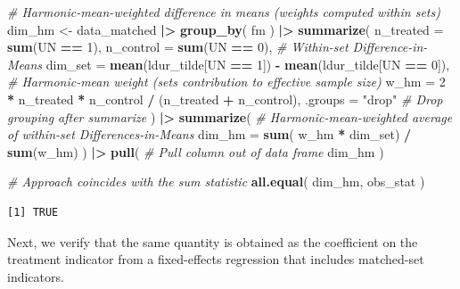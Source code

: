 \documentclass[
  12pt,
  leqno]{article}
\newenvironment{Shaded}{\begin{snugshade}}{\end{snugshade}}
\newcommand{\AttributeTok}[1]{\textcolor[rgb]{0.13,0.29,0.53}{#1}}
\newcommand{\CommentTok}[1]{\textcolor[rgb]{0.56,0.35,0.01}{\textit{#1}}}
\newcommand{\DecValTok}[1]{\textcolor[rgb]{0.00,0.00,0.81}{#1}}
\newcommand{\FunctionTok}[1]{\textcolor[rgb]{0.13,0.29,0.53}{\textbf{#1}}}
\newcommand{\NormalTok}[1]{#1}
\newcommand{\OtherTok}[1]{\textcolor[rgb]{0.56,0.35,0.01}{#1}}
\newcommand{\SpecialCharTok}[1]{\textcolor[rgb]{0.81,0.36,0.00}{\textbf{#1}}}
\newcommand{\StringTok}[1]{\textcolor[rgb]{0.31,0.60,0.02}{#1}}
\begin{document}
\begin{Shaded}
\begin{Highlighting}[]
\CommentTok{\# Harmonic{-}mean{-}weighted difference in means (weights computed within sets)}
\NormalTok{dim\_hm }\OtherTok{\textless{}{-}}\NormalTok{ data\_matched }\SpecialCharTok{|\textgreater{}}
  \FunctionTok{group\_by}\NormalTok{(}
\NormalTok{    fm}
\NormalTok{  ) }\SpecialCharTok{|\textgreater{}}
  \FunctionTok{summarize}\NormalTok{(}
    \AttributeTok{n\_treated =} \FunctionTok{sum}\NormalTok{(UN }\SpecialCharTok{==} \DecValTok{1}\NormalTok{),}
    \AttributeTok{n\_control =} \FunctionTok{sum}\NormalTok{(UN }\SpecialCharTok{==} \DecValTok{0}\NormalTok{),}
    \CommentTok{\# Within{-}set Difference{-}in{-}Means}
    \AttributeTok{dim\_set   =} \FunctionTok{mean}\NormalTok{(ldur\_tilde[UN }\SpecialCharTok{==} \DecValTok{1}\NormalTok{]) }\SpecialCharTok{{-}} \FunctionTok{mean}\NormalTok{(ldur\_tilde[UN }\SpecialCharTok{==} \DecValTok{0}\NormalTok{]),}
    \CommentTok{\# Harmonic{-}mean weight (set\textquotesingle{}s contribution to effective sample size)}
    \AttributeTok{w\_hm      =} \DecValTok{2} \SpecialCharTok{*}\NormalTok{ n\_treated }\SpecialCharTok{*}\NormalTok{ n\_control }\SpecialCharTok{/}\NormalTok{ (n\_treated }\SpecialCharTok{+}\NormalTok{ n\_control),}
    \AttributeTok{.groups   =} \StringTok{"drop"} \CommentTok{\# Drop grouping after summarize}
\NormalTok{  ) }\SpecialCharTok{|\textgreater{}}
  \FunctionTok{summarize}\NormalTok{(}
    \CommentTok{\# Harmonic{-}mean{-}weighted average of within{-}set Differences{-}in{-}Means}
    \AttributeTok{dim\_hm =} \FunctionTok{sum}\NormalTok{(}
\NormalTok{      w\_hm }\SpecialCharTok{*}\NormalTok{ dim\_set) }\SpecialCharTok{/} \FunctionTok{sum}\NormalTok{(w\_hm)}
\NormalTok{  ) }\SpecialCharTok{|\textgreater{}}
  \FunctionTok{pull}\NormalTok{( }\CommentTok{\# Pull column out of data frame}
\NormalTok{    dim\_hm}
\NormalTok{  )}

\CommentTok{\# Approach coincides with the sum statistic}
\FunctionTok{all.equal}\NormalTok{(}
\NormalTok{  dim\_hm, obs\_stat}
\NormalTok{)}
\end{Highlighting}
\end{Shaded}

\begin{verbatim}
[1] TRUE
\end{verbatim}

\doublespacing

Next, we verify that the same quantity is obtained as the coefficient on
the treatment indicator from a fixed-effects regression that includes
matched-set indicators.
\end{document}
